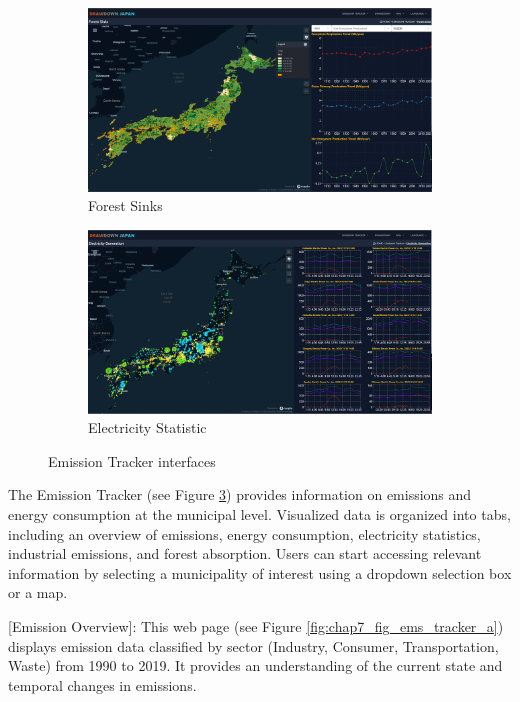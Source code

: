 \begin{figure}[tbh!]
  \begin{subfigure}{.5\textwidth}
    \centering
    \includegraphics[width=.9\textwidth]{figs/chap7/ems_forest.png}
      \caption{Forest Sinks}
      \label{fig:chap7_fig_ems_tracker_d}
  \end{subfigure}%
  \begin{subfigure}{.5\textwidth}
      \centering
      \includegraphics[width=.9\textwidth]{figs/chap7/ems_electric.png}
      \caption{Electricity Statistic}
      \label{fig:chap7_fig_ems_tracker_e}
  \end{subfigure}
  \caption{Emission Tracker interfaces}
  \label{fig:chap7_fig_ems_tracker}
\end{figure}

The Emission Tracker (see Figure \ref{fig:chap7_fig_ems_tracker}) provides information on emissions and energy consumption at the municipal level. Visualized data is organized into tabs, including an overview of emissions, energy consumption, electricity statistics, industrial emissions, and forest absorption. Users can start accessing relevant information by selecting a municipality of interest using a dropdown selection box or a map.\par

[Emission Overview]: This web page (see Figure \ref{fig:chap7_fig_ems_tracker_a}) displays emission data classified by sector (Industry, Consumer, Transportation, Waste) from 1990 to 2019. It provides an understanding of the current state and temporal changes in emissions.\par

